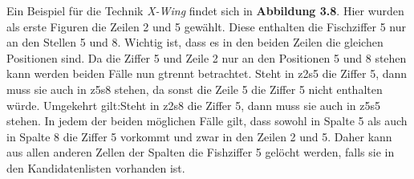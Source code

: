 Ein Beispiel für die Technik \textit{X-Wing} findet sich in \textbf{Abbildung 3.8}. Hier wurden als erste Figuren die Zeilen 2 und 5 gewählt. Diese enthalten die Fischziffer 5 nur an den Stellen 5 und 8. Wichtig ist, dass es in den beiden Zeilen die gleichen Positionen sind. Da die Ziffer 5 und Zeile 2 nur an den Positionen 5 und 8 stehen kann werden beiden Fälle nun gtrennt betrachtet. Steht in z2s5 die Ziffer 5, dann muss sie auch in z5s8 stehen, da sonst die Zeile 5 die Ziffer 5 nicht enthalten würde. Umgekehrt gilt:Steht in z2s8 die Ziffer 5, dann muss sie auch in z5s5 stehen. In jedem der beiden möglichen Fälle gilt, dass sowohl in Spalte 5 als auch in Spalte 8 die Ziffer 5 vorkommt und zwar in den Zeilen 2 und 5. Daher kann aus allen anderen Zellen der Spalten die Fishziffer 5 gelöcht werden, falls sie in den Kandidatenlisten vorhanden ist.